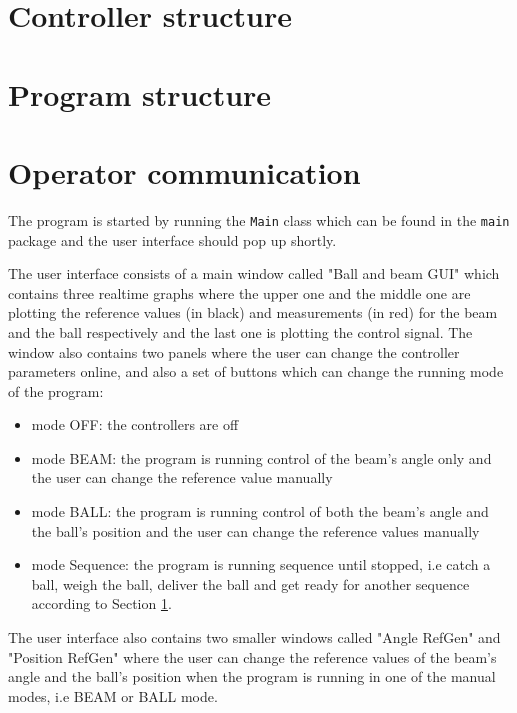 \documentclass{article}
\begin{document}
\section{Controller structure} \label{sec:controller_structure}


\section{Program structure}



\section{Operator communication}\label{OpCom}
The program is started by running the \texttt{Main} class which can be found in the \texttt{main} package and the user interface should pop up shortly.

The user interface consists of a main window called "Ball and beam GUI" which contains three realtime graphs where the upper one and the middle one are plotting the reference values (in black) and measurements (in red) for the beam and the ball respectively and the last one is plotting the control signal. The window also contains two panels where the user can change the controller parameters online, and also a set of buttons which can change the running mode of the program:
\begin{itemize}
\item mode OFF: the controllers are off
\item mode BEAM: the program is running control of the beam's angle only and the user can change the reference value manually
\item mode BALL: the program is running control of both the beam's angle and the ball's position and the user can change the reference values manually
\item mode Sequence: the program is running sequence until stopped, i.e catch a ball, weigh the ball, deliver the ball and get ready for another sequence according to Section \ref{sec:controller_structure}.
\end{itemize}

The user interface also contains two smaller windows called "Angle RefGen" and "Position RefGen" where the user can change the reference values of the beam's angle and the ball's position when the program is running in one of the manual modes, i.e BEAM or BALL mode.
\end{document}
